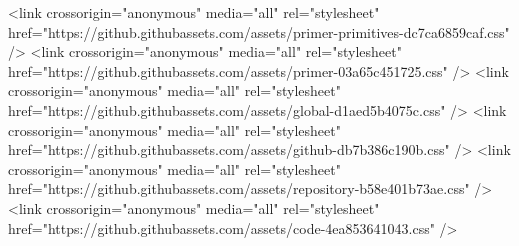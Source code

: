     <link crossorigin="anonymous" media="all" rel="stylesheet" href="https://github.githubassets.com/assets/primer-primitives-dc7ca6859caf.css" />
    <link crossorigin="anonymous" media="all" rel="stylesheet" href="https://github.githubassets.com/assets/primer-03a65c451725.css" />
    <link crossorigin="anonymous" media="all" rel="stylesheet" href="https://github.githubassets.com/assets/global-d1aed5b4075c.css" />
    <link crossorigin="anonymous" media="all" rel="stylesheet" href="https://github.githubassets.com/assets/github-db7b386c190b.css" />
  <link crossorigin="anonymous" media="all" rel="stylesheet" href="https://github.githubassets.com/assets/repository-b58e401b73ae.css" />
<link crossorigin="anonymous" media="all" rel="stylesheet" href="https://github.githubassets.com/assets/code-4ea853641043.css" />

  


